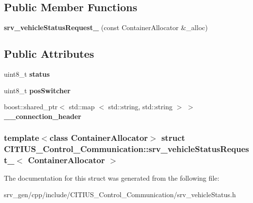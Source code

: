 \subsection*{\-Public \-Member \-Functions}
\begin{DoxyCompactItemize}
\item 
\hypertarget{struct_c_i_t_i_u_s___control___communication_1_1srv__vehicle_status_request___ac8d7a2ca3d595d548fe6e02c79f7b5e0}{{\bfseries srv\-\_\-vehicle\-Status\-Request\-\_\-} (const \-Container\-Allocator \&\-\_\-alloc)}\label{struct_c_i_t_i_u_s___control___communication_1_1srv__vehicle_status_request___ac8d7a2ca3d595d548fe6e02c79f7b5e0}

\end{DoxyCompactItemize}
\subsection*{\-Public \-Attributes}
\begin{DoxyCompactItemize}
\item 
\hypertarget{struct_c_i_t_i_u_s___control___communication_1_1srv__vehicle_status_request___a89313c9ec6cdd25ce75f0660b2017009}{uint8\-\_\-t {\bfseries status}}\label{struct_c_i_t_i_u_s___control___communication_1_1srv__vehicle_status_request___a89313c9ec6cdd25ce75f0660b2017009}

\item 
\hypertarget{struct_c_i_t_i_u_s___control___communication_1_1srv__vehicle_status_request___a62565a6784f31a2b2ce6355c165f20c1}{uint8\-\_\-t {\bfseries pos\-Switcher}}\label{struct_c_i_t_i_u_s___control___communication_1_1srv__vehicle_status_request___a62565a6784f31a2b2ce6355c165f20c1}

\item 
\hypertarget{struct_c_i_t_i_u_s___control___communication_1_1srv__vehicle_status_request___a20b4c4ffa63e2a0c8470014219480044}{boost\-::shared\-\_\-ptr$<$ std\-::map\*
$<$ std\-::string, std\-::string $>$ $>$ {\bfseries \-\_\-\-\_\-connection\-\_\-header}}\label{struct_c_i_t_i_u_s___control___communication_1_1srv__vehicle_status_request___a20b4c4ffa63e2a0c8470014219480044}

\end{DoxyCompactItemize}
\subsubsection*{template$<$class Container\-Allocator$>$ struct C\-I\-T\-I\-U\-S\-\_\-\-Control\-\_\-\-Communication\-::srv\-\_\-vehicle\-Status\-Request\-\_\-$<$ Container\-Allocator $>$}



\-The documentation for this struct was generated from the following file\-:\begin{DoxyCompactItemize}
\item 
srv\-\_\-gen/cpp/include/\-C\-I\-T\-I\-U\-S\-\_\-\-Control\-\_\-\-Communication/srv\-\_\-vehicle\-Status.\-h\end{DoxyCompactItemize}

